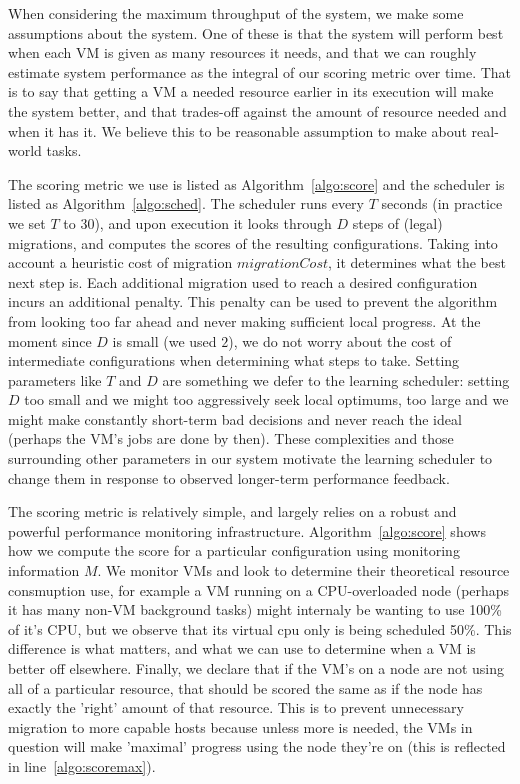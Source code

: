 When considering the maximum throughput of the system, we make some assumptions
about the system.  One of these is that the system will perform best when each
VM is given as many resources it needs, and that we can roughly estimate
system performance as the integral of our scoring metric over time.  That is to
say that getting a VM a needed resource earlier in its execution will
make the system better, and that trades-off against the amount of resource
needed and when it has it.  We believe this to be reasonable assumption to make
about real-world tasks.



The scoring metric we use is listed as Algorithm~\ref{algo:score} and the scheduler is
listed as Algorithm~\ref{algo:sched}.  The scheduler runs every $T$ seconds (in
practice we set $T$ to 30), and upon execution it looks through $D$ steps of
(legal) migrations, and computes the scores of the resulting configurations.
Taking into account a heuristic cost of migration $migrationCost$, it determines
what the best next step is.  Each additional migration used to reach a desired
configuration incurs an additional penalty.   This penalty can be used to
prevent the algorithm from looking too far ahead and never making sufficient
local progress.  At the moment since $D$ is small (we used $2$), we do not worry
about the cost of intermediate configurations when determining what steps to
take.  Setting parameters like $T$ and $D$ are something we defer to the
learning scheduler: setting $D$ too small and we might too aggressively seek
local optimums, too large and we might make constantly short-term bad decisions
and never reach the ideal (perhaps the VM's jobs are done by then).  These
complexities and those surrounding other parameters in our system motivate the
learning scheduler to change them in response to observed longer-term
performance feedback.

The scoring metric is relatively simple, and largely relies on a robust and
powerful performance monitoring infrastructure.  Algorithm~\ref{algo:score}
shows how we compute the score for a particular configuration using monitoring
information $M$.  We monitor VMs and look to determine their theoretical
resource consmuption use, for example a VM running on a CPU-overloaded
node (perhaps it has many non-VM background tasks) might internaly be wanting to
use 100\% of it's CPU, but we observe that its virtual cpu only is being
scheduled 50\%.  This difference is what matters, and what we can use to
determine when a VM is better off elsewhere.  Finally, we declare
that if the VM's on a node are not using all of a particular resource, that
should be scored the same as if the node has exactly the 'right' amount of that
resource.  This is to prevent unnecessary migration to more capable hosts
because unless more is needed, the VMs in question will make 'maximal'
progress using the node they're on (this is reflected in
line~\ref{algo:scoremax}).


